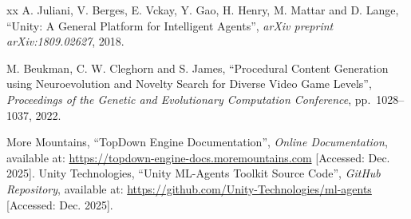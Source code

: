 \documentclass[a4paper,12pt,oneside]{book}
\begin{document}
\begin{thebibliography}{xx}
	A. Juliani, V. Berges, E. Vckay, Y. Gao, H. Henry, M. Mattar and D. Lange, ``Unity: A General Platform for Intelligent Agents'',
	{\em arXiv preprint arXiv:1809.02627}, 2018.

	M. Beukman, C. W. Cleghorn and S. James, ``Procedural Content Generation using Neuroevolution and Novelty Search for Diverse Video Game Levels'',
	{\em Proceedings of the Genetic and Evolutionary Computation Conference}, pp.~1028--1037, 2022.

	More Mountains, ``TopDown Engine Documentation'',
	{\em Online Documentation}, available at: \url{https://topdown-engine-docs.moremountains.com} [Accessed: Dec. 2025].
	Unity Technologies, ``Unity ML-Agents Toolkit Source Code'',
	{\em GitHub Repository}, available at: \url{https://github.com/Unity-Technologies/ml-agents} [Accessed: Dec. 2025].
	
\end{thebibliography}
\end{document}
